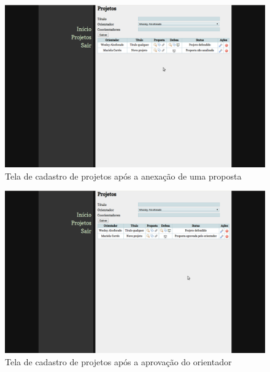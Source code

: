 \begin{figure}[htbp]
\centering
\includegraphics[width=1\textwidth]{fig/telas/processo/aluno_04_proposta_anexada.png}
\caption{Tela de cadastro de projetos após a anexação de uma proposta}
\label{fig:aluno_04_proposta_anexada}
\end{figure}

\begin{figure}[htbp]
\centering
\includegraphics[width=1\textwidth]{fig/telas/processo/aluno_05_proposta_aprovada_orientador.png}
\caption{Tela de cadastro de projetos após a aprovação do orientador}
\label{fig:aluno_05_proposta_aprovada_orientador}
\end{figure}

